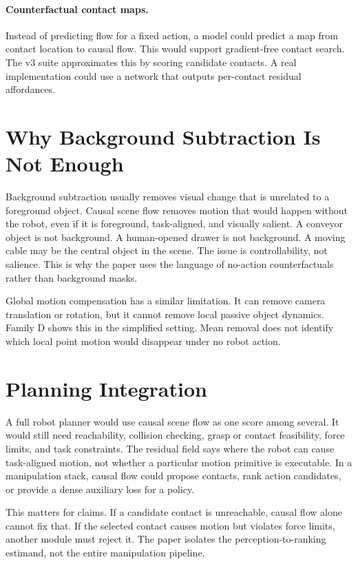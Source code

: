 \documentclass{article}
\begin{document}
\paragraph{Counterfactual contact maps.}
Instead of predicting flow for a fixed action, a model could predict a map from contact
location to causal flow.  This would support gradient-free contact search.  The v3 suite
approximates this by scoring candidate contacts.  A real implementation could use a
network that outputs per-contact residual affordances.

\section{Why Background Subtraction Is Not Enough}

Background subtraction usually removes visual change that is unrelated to a foreground
object.  Causal scene flow removes motion that would happen without the robot, even if it
is foreground, task-aligned, and visually salient.  A conveyor object is not background.
A human-opened drawer is not background.  A moving cable may be the central object in the
scene.  The issue is controllability, not salience.  This is why the paper uses the
language of no-action counterfactuals rather than background masks.

Global motion compensation has a similar limitation.  It can remove camera translation or
rotation, but it cannot remove local passive object dynamics.  Family D shows this in
the simplified setting.  Mean removal does not identify which local point motion would
disappear under no robot action.

\section{Planning Integration}

A full robot planner would use causal scene flow as one score among several.  It would
still need reachability, collision checking, grasp or contact feasibility, force limits,
and task constraints.  The residual field says where the robot can cause task-aligned
motion, not whether a particular motion primitive is executable.  In a manipulation
stack, causal flow could propose contacts, rank action candidates, or provide a dense
auxiliary loss for a policy.

This matters for claims.  If a candidate contact is unreachable, causal flow alone cannot
fix that.  If the selected contact causes motion but violates force limits, another
module must reject it.  The paper isolates the perception-to-ranking estimand, not the
entire manipulation pipeline.
\end{document}
